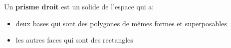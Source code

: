 
Un \textbf{prisme droit} est un solide de l'espace qui a:
\begin{itemize}
\item deux bases qui sont des polygones de mêmes formes et superposables
\item les autres faces qui sont des rectangles
\end{itemize}